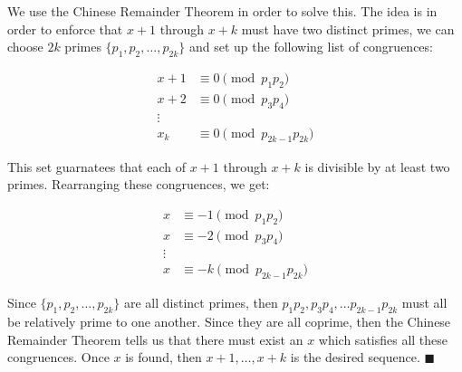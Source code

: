\documentclass[11pt]{article}
\begin{document}
\begin{solution}
  We use the Chinese Remainder Theorem in order to solve this. The idea is in order to enforce that $x+1$ through $x+k$ must have two distinct primes, we can choose $2k$ primes $\{p_1, p_2, \dots, p_{2k}\}$ and set up the following list of congruences: 

  \begin{align*}
    x+1 &\equiv 0 \pmod{p_1p_2}\\
    x+2 &\equiv 0 \pmod{p_3p_4}\\
    \vdots\\
    x_k &\equiv 0 \pmod{p_{2k - 1}p_{2k}}
  \end{align*}

  This set guarnatees that each of $x+1$ through $x+k$ is divisible by at least two primes. Rearranging these congruences, we get: 

  \begin{align*}
    x &\equiv -1 \pmod{p_1p_2}\\
    x &\equiv -2 \pmod{p_3p_4}\\
    \vdots\\
    x &\equiv -k \pmod{p_{2k - 1}p_{2k}}
  \end{align*} 

  Since $\{p_1, p_2, \dots, p_{2k}\}$ are all distinct primes, then $p_1p_2, p_3p_4, \dots p_{2k-1}p_{2k}$ must all be relatively prime to one another. Since they are all coprime, then the Chinese Remainder Theorem tells us that there must exist an $x$ which satisfies all these congruences. Once $x$ is found, then $x+1, \dots, x+k$ is the desired sequence. $\blacksquare$

  



  

\end{solution}
\end{document}
